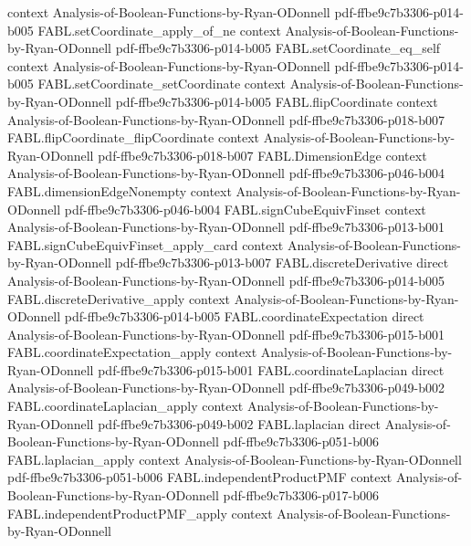 \begin{theorem}
  {context}
  {Analysis-of-Boolean-Functions-by-Ryan-ODonnell}
  {pdf-ffbe9c7b3306-p014-b005}
\proofstep
  {FABL.setCoordinate_apply_of_ne}
  {context}
  {Analysis-of-Boolean-Functions-by-Ryan-ODonnell}
  {pdf-ffbe9c7b3306-p014-b005}
\proofstep
  {FABL.setCoordinate_eq_self}
  {context}
  {Analysis-of-Boolean-Functions-by-Ryan-ODonnell}
  {pdf-ffbe9c7b3306-p014-b005}
\proofstep
  {FABL.setCoordinate_setCoordinate}
  {context}
  {Analysis-of-Boolean-Functions-by-Ryan-ODonnell}
  {pdf-ffbe9c7b3306-p014-b005}
\proofstep
  {FABL.flipCoordinate}
  {context}
  {Analysis-of-Boolean-Functions-by-Ryan-ODonnell}
  {pdf-ffbe9c7b3306-p018-b007}
\proofstep
  {FABL.flipCoordinate_flipCoordinate}
  {context}
  {Analysis-of-Boolean-Functions-by-Ryan-ODonnell}
  {pdf-ffbe9c7b3306-p018-b007}
\proofstep
  {FABL.DimensionEdge}
  {context}
  {Analysis-of-Boolean-Functions-by-Ryan-ODonnell}
  {pdf-ffbe9c7b3306-p046-b004}
\proofstep
  {FABL.dimensionEdgeNonempty}
  {context}
  {Analysis-of-Boolean-Functions-by-Ryan-ODonnell}
  {pdf-ffbe9c7b3306-p046-b004}
\proofstep
  {FABL.signCubeEquivFinset}
  {context}
  {Analysis-of-Boolean-Functions-by-Ryan-ODonnell}
  {pdf-ffbe9c7b3306-p013-b001}
\proofstep
  {FABL.signCubeEquivFinset_apply_card}
  {context}
  {Analysis-of-Boolean-Functions-by-Ryan-ODonnell}
  {pdf-ffbe9c7b3306-p013-b007}
\proofstep
  {FABL.discreteDerivative}
  {direct}
  {Analysis-of-Boolean-Functions-by-Ryan-ODonnell}
  {pdf-ffbe9c7b3306-p014-b005}
\proofstep
  {FABL.discreteDerivative_apply}
  {context}
  {Analysis-of-Boolean-Functions-by-Ryan-ODonnell}
  {pdf-ffbe9c7b3306-p014-b005}
\proofstep
  {FABL.coordinateExpectation}
  {direct}
  {Analysis-of-Boolean-Functions-by-Ryan-ODonnell}
  {pdf-ffbe9c7b3306-p015-b001}
\proofstep
  {FABL.coordinateExpectation_apply}
  {context}
  {Analysis-of-Boolean-Functions-by-Ryan-ODonnell}
  {pdf-ffbe9c7b3306-p015-b001}
\proofstep
  {FABL.coordinateLaplacian}
  {direct}
  {Analysis-of-Boolean-Functions-by-Ryan-ODonnell}
  {pdf-ffbe9c7b3306-p049-b002}
\proofstep
  {FABL.coordinateLaplacian_apply}
  {context}
  {Analysis-of-Boolean-Functions-by-Ryan-ODonnell}
  {pdf-ffbe9c7b3306-p049-b002}
\proofstep
  {FABL.laplacian}
  {direct}
  {Analysis-of-Boolean-Functions-by-Ryan-ODonnell}
  {pdf-ffbe9c7b3306-p051-b006}
\proofstep
  {FABL.laplacian_apply}
  {context}
  {Analysis-of-Boolean-Functions-by-Ryan-ODonnell}
  {pdf-ffbe9c7b3306-p051-b006}
\proofstep
  {FABL.independentProductPMF}
  {context}
  {Analysis-of-Boolean-Functions-by-Ryan-ODonnell}
  {pdf-ffbe9c7b3306-p017-b006}
\proofstep
  {FABL.independentProductPMF_apply}
  {context}
  {Analysis-of-Boolean-Functions-by-Ryan-ODonnell}

\end{theorem}
